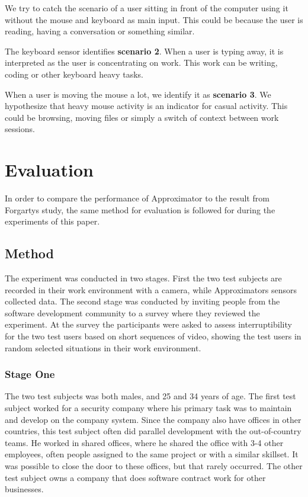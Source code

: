 \documentclass{sigchi}
\begin{document}
We try to catch the scenario of a user sitting in front of the computer using it without the mouse and keyboard as main input.
This could be because the user is reading, having a conversation or something similar.

The keyboard sensor identifies \textbf{scenario 2}.
When a user is typing away, it is interpreted as the user is concentrating on work.
This work can be writing, coding or other keyboard heavy tasks.

When a user is moving the mouse a lot, we identify it as \textbf{scenario 3}.
We hypothesize that heavy mouse activity is an indicator for casual activity.
This could be browsing, moving files or simply a switch of context between work sessions.


\section{Evaluation}
In order to compare the performance of Approximator to the result from Forgartys study, the same method for evaluation is followed for during the experiments of this paper.

\subsection{Method}
The experiment was conducted in two stages.
First the two test subjects are recorded in their work environment with a camera, while Approximators sensors collected data.
The second stage was conducted by inviting people from the software development community to a survey where they reviewed the experiment.
At the survey the participants were asked to assess interruptibility for the two test users based on short sequences of video, showing the test users in random selected situations in their work environment.

\subsubsection{Stage One}
The two test subjects was both males, and 25 and 34 years of age.
The first test subject worked for a security company where his primary task was to maintain and develop on the company system.
Since the company also have offices in other countries, this test subject often did parallel development with the out-of-country teams.
He worked in shared offices, where he shared the office with 3-4 other employees, often people assigned to the same project or with a similar skillset.
It was possible to close the door to these offices, but that rarely occurred.
The other test subject owns a company that does software contract work for other businesses.
\end{document}
